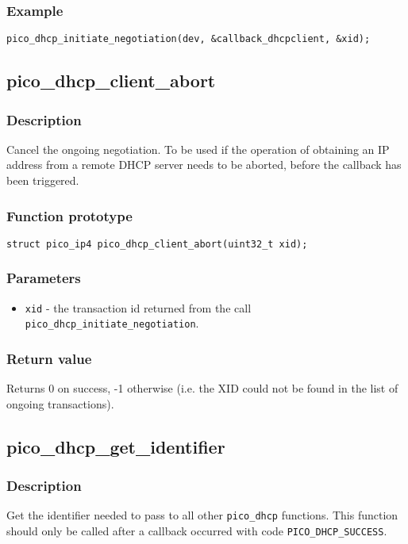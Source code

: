 \subsubsection*{Example}
\begin{verbatim}
pico_dhcp_initiate_negotiation(dev, &callback_dhcpclient, &xid);
\end{verbatim}

\subsection{pico\_dhcp\_client\_abort}

\subsubsection*{Description}
Cancel the ongoing negotiation. To be used if the operation of obtaining an IP address from a remote DHCP server needs to be aborted, before the callback has been triggered.

\subsubsection*{Function prototype}
\texttt{struct pico\_ip4 pico\_dhcp\_client\_abort(uint32\_t xid);}

\subsubsection*{Parameters}
\begin{itemize}[noitemsep]
    \item \texttt{xid} - the transaction id returned from the call \texttt{pico\_dhcp\_initiate\_negotiation}.
\end{itemize}

\subsubsection*{Return value}
Returns 0 on success, -1 otherwise (i.e. the XID could not be found in the list of ongoing transactions).


\subsection{pico\_dhcp\_get\_identifier}

\subsubsection*{Description}
Get the identifier needed to pass to all other \texttt{pico\_dhcp} functions. This function should only be called after a callback occurred with code \texttt{PICO\_DHCP\_SUCCESS}. 

